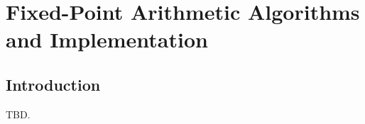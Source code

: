 \chapter{Fixed-Point Arithmetic Algorithms and Implementation}        
\label{caal2}

\section{Introduction}
\label{caal2:sint0}

TBD.


